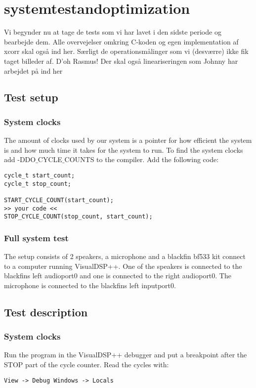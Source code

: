 \chapter{systemtestandoptimization}
Vi begynder nu at tage de tests som vi har lavet i den sidste periode og bearbejde dem. Alle overvejelser omkring C-koden og egen implementation af xcorr skal også ind her. Særligt de operationsmålinger som vi (desværre) ikke fik taget billeder af. D'oh Rasmus! Der skal også lineariseringen som Johnny har arbejdet på ind her
\section{Test setup}
\subsection{System clocks}
The amount of clocks used by our system is a pointer for how efficient the system is and how much time it takes for the system to run. To find the system clocks add -DDO$\_$CYCLE$\_$COUNTS to the compiler. Add the following code:\\
\begin{lstlisting}
cycle_t start_count;
cycle_t stop_count;
	
START_CYCLE_COUNT(start_count);
>> your code <<
STOP_CYCLE_COUNT(stop_count, start_count);
\end{lstlisting}
\subsection{Full system test}
The setup consists of 2 speakers, a microphone and a blackfin bf533 kit connect to a computer running VisualDSP++. One of the speakers is connected to the blackfins left audioport0 and one is connected to the right audioport0. The microphone is connected to the blackfins left inputport0. 

\section{Test description}
\subsection{System clocks}
Run the program in the VisualDSP++ debugger and put a breakpoint after the STOP part of the cycle counter. Read the cycles with:
\begin{verbatim}
View -> Debug Windows -> Locals
\end{verbatim}
